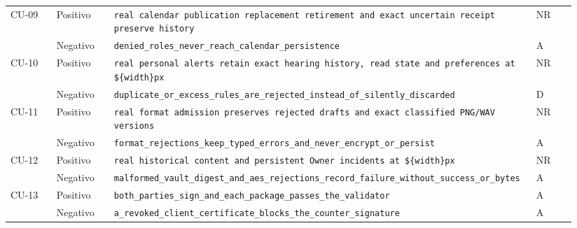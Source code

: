 \begin{longtable}{@{}L{0.08\linewidth} L{0.10\linewidth} L{0.69\linewidth} C{0.07\linewidth}@{}}
  CU-09 & Positivo & \newline \texttt{real calendar publication replacement retirement and exact uncertain receipt preserve history} & NR \\*
   & Negativo & \newline \texttt{denied\_roles\_never\_reach\_calendar\_persistence} & A \\
  \addlinespace
  CU-10 & Positivo & \newline \texttt{real personal alerts retain exact hearing history, read state and preferences at \$\{width\}px} & NR \\*
   & Negativo & \newline \texttt{duplicate\_or\_excess\_rules\_are\_rejected\_instead\_of\_silently\_discarded} & D \\
  \addlinespace
  CU-11 & Positivo & \newline \texttt{real format admission preserves rejected drafts and exact classified PNG/WAV versions} & NR \\*
   & Negativo & \newline \texttt{format\_rejections\_keep\_typed\_errors\_and\_never\_encrypt\_or\_persist} & A \\
  \addlinespace
  CU-12 & Positivo & \newline \texttt{real historical content and persistent Owner incidents at \$\{width\}px} & NR \\*
   & Negativo & \newline \texttt{malformed\_vault\_digest\_and\_aes\_rejections\_record\_failure\_without\_success\_or\_bytes} & A \\
  \addlinespace
  CU-13 & Positivo & \newline \texttt{both\_parties\_sign\_and\_each\_package\_passes\_the\_validator} & A \\*
   & Negativo & \newline \texttt{a\_revoked\_client\_certificate\_blocks\_the\_counter\_signature} & A \\

\end{longtable}
